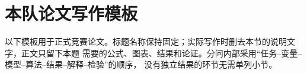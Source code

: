 \section{本队论文写作模板}

以下模板用于正式竞赛论文。标题名称保持固定；实际写作时删去本节的说明文字，正文只留下本题
需要的公式、图表、结果和论证。分问内部采用“任务--变量--模型--算法--结果--解释--检验”的顺序，
没有独立结果的环节无需单列小节。

